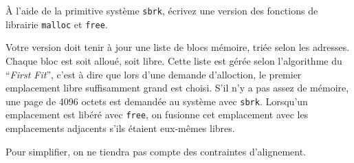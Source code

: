 \question

\`A l'aide de la primitive système {\tt sbrk}, écrivez une version
des fonctions de librairie {\tt malloc} et {\tt free}.

Votre version doit tenir à jour une liste de blocs mémoire, triée
selon les adresses. Chaque bloc
est soit alloué, soit libre. Cette liste est gérée selon l'algorithme
du ``{\em First Fit\/}'', c'est à dire que lors d'une demande
d'alloction, le premier emplacement libre suffisamment grand est
choisi. S'il n'y a pas assez de mémoire, une page de 4096 octets
est demandée au système avec {\tt sbrk}. Lorsqu'un emplacement est
libéré avec {\tt free}, on fusionne cet emplacement avec les
emplacements adjacents s'ils étaient eux-mêmes libres.

Pour simplifier, on ne tiendra pas compte des contraintes
d'alignement.

